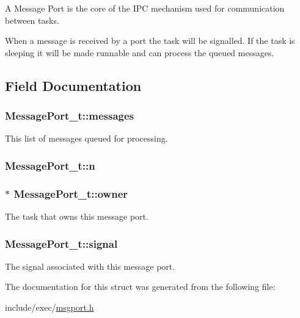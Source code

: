 A Message Port is the core of the I\+P\+C mechanism used for communication between tasks.

When a message is received by a port the task will be signalled. If the task is sleeping it will be made runnable and can process the queued messages. 

\subsection{Field Documentation}
\hypertarget{structMessagePort__t_ac205ddab2edee9954f8b0ad22bd29d09}{
\subsubsection[{messages}]{ Message\+Port\+\_\+t\+::messages}}\label{structMessagePort__t_ac205ddab2edee9954f8b0ad22bd29d09}


This list of messages queued for processing. 

\hypertarget{structMessagePort__t_aef6611866e17a017727b3d3d317beeb7}{
\subsubsection[{n}]{ Message\+Port\+\_\+t\+::n}}\label{structMessagePort__t_aef6611866e17a017727b3d3d317beeb7}
\hypertarget{structMessagePort__t_a38ef8fc428ef33c108d1734731d1b40e}{
\subsubsection[{owner}]{$\ast$ Message\+Port\+\_\+t\+::owner}}\label{structMessagePort__t_a38ef8fc428ef33c108d1734731d1b40e}


The task that owns this message port. 

\hypertarget{structMessagePort__t_a6edbc6af8afbde167057928a7b45c793}{
\subsubsection[{signal}]{ Message\+Port\+\_\+t\+::signal}}\label{structMessagePort__t_a6edbc6af8afbde167057928a7b45c793}


The signal associated with this message port. 



The documentation for this struct was generated from the following file\+:\begin{DoxyCompactItemize}
\item 
include/exec/\hyperlink{msgport_8h}{msgport.\+h}\end{DoxyCompactItemize}
